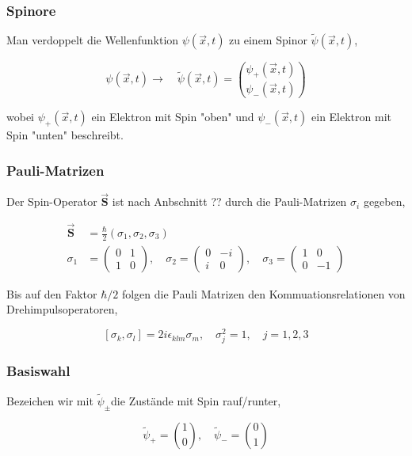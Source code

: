 \documentclass[10pt, letterpaper]{article}
\begin{document}
\subsubsection*{Spinore}
Man verdoppelt die Wellenfunktion $\psi(\vec{x}, t)$ zu einem Spinor $\tilde{\psi}(\vec{x}, t)$,

$$
\psi(\vec{x}, t) \rightarrow \quad \tilde{\psi}(\vec{x}, t)=\binom{\psi_{+}(\vec{x}, t)}{\psi_{-}(\vec{x}, t)}
$$

wobei $\psi_{+}(\vec{x}, t)$ ein Elektron mit Spin "oben" und $\psi_{-}(\vec{x}, t)$ ein Elektron mit Spin "unten" beschreibt.

\subsubsection*{Pauli-Matrizen}
Der Spin-Operator $\overrightarrow{\mathbf{S}}$ ist nach Anbschnitt ?? durch die Pauli-Matrizen $\sigma_{i}$ gegeben,

$$
\begin{aligned}
\overrightarrow{\mathbf{S}} & =\frac{\hbar}{2}\left(\sigma_{1}, \sigma_{2}, \sigma_{3}\right) \\
\sigma_{1} & =\left(\begin{array}{cc}
0 & 1 \\
1 & 0
\end{array}\right), \quad \sigma_{2}=\left(\begin{array}{cc}
0 & -i \\
i & 0
\end{array}\right), \quad \sigma_{3}=\left(\begin{array}{cc}
1 & 0 \\
0 & -1
\end{array}\right)
\end{aligned}
$$

Bis auf den Faktor $\hbar / 2$ folgen die Pauli Matrizen den Kommuationsrelationen von Drehimpulsoperatoren,

$$
\left[\sigma_{k}, \sigma_{l}\right]=2 i \epsilon_{k l m} \sigma_{m}, \quad \sigma_{j}^{2}=1, \quad j=1,2,3
$$

\subsubsection*{Basiswahl}
Bezeichen wir mit $\tilde{\psi}_{ \pm}$die Zustände mit Spin rauf/runter,

$$
\tilde{\psi}_{+}=\binom{1}{0}, \quad \tilde{\psi}_{-}=\binom{0}{1}
$$
\end{document}
